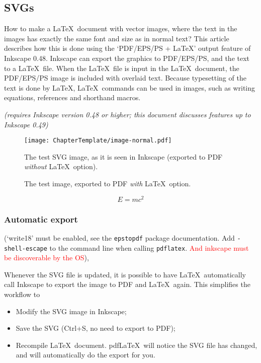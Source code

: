 \subsection{SVGs}
How to make a \LaTeX\ document with vector images, where the text in the images
has exactly the same font and size as in normal text? This article describes how
this is done using the `PDF/EPS/PS + LaTeX' output feature of Inkscape 0.48.
Inkscape can export the graphics to PDF/EPS/PS, and the text to a \LaTeX\ file.
When the \LaTeX\ file is input in the \LaTeX\ document, the PDF/EPS/PS image is
included with overlaid text. Because typesetting of the text is done by \LaTeX,
\LaTeX\ commands can be used in images, such as writing equations, references
and shorthand macros.

\emph{(requires Inkscape version 0.48 or higher; this document discusses features up to Inkscape 0.49)}

\begin{figure}
    \centering
      \texttt{[image: ChapterTemplate/image-normal.pdf]}
      \caption[The test SVG image, as it is seen in Inkscape]
      {The test SVG image, as it is seen in Inkscape (exported to PDF
      \emph{without} \LaTeX\ option).}
      \label{fig:normal}
\end{figure}

\begin{figure}
\centering
    
    \caption{The test image, exported to PDF \emph{with} \LaTeX\ option.}
    \label{fig:pdflatex}
\end{figure}

\begin{equation}
    \label{eq:emc2}
    E = mc^{2}
\end{equation}

\subsubsection{Automatic export}

(`write18' must be enabled, see the {\small\verb|epstopdf|} package
documentation. Add {\small\verb|-shell-escape|} to the command line when calling
{\small\verb|pdflatex|}. \textcolor{red}{And inkscape must be discoverable by the
OS}),

Whenever the SVG file is updated, it is possible to have \LaTeX\ automatically call Inkscape to export the image to PDF and \LaTeX\ again. This simplifies the workflow to
\begin{itemize}
	\item Modify the SVG image in Inkscape;
	\item Save the SVG (Ctrl+S, no need to export to PDF);
	\item Recompile \LaTeX\ document. pdf\LaTeX\ will notice the SVG file has changed, and will automatically do the export for you.
\end{itemize}

